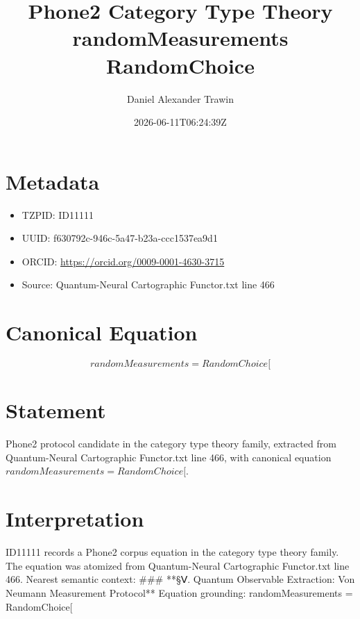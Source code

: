 \documentclass[11pt]{article}
\title{Phone2 Category Type Theory randomMeasurements RandomChoice}
\author{Daniel Alexander Trawin}
\date{2026-06-11T06:24:39Z}
\begin{document}
\maketitle
\section*{Metadata}
\begin{itemize}
\item TZPID: ID11111
\item UUID: f630792c-946c-5a47-b23a-ccc1537ea9d1
\item ORCID: \url{https://orcid.org/0009-0001-4630-3715}
\item Source: Quantum-Neural Cartographic Functor.txt line 466
\end{itemize}
\section*{Canonical Equation}
\[
randomMeasurements = RandomChoice[
\]
\section*{Statement}
Phone2 protocol candidate in the category type theory family, extracted from Quantum-Neural Cartographic Functor.txt line 466, with canonical equation $randomMeasurements = RandomChoice[$.
\section*{Interpretation}
ID11111 records a Phone2 corpus equation in the category type theory family. The equation was atomized from Quantum-Neural Cartographic Functor.txt line 466. Nearest semantic context: ### **§Ⅴ. Quantum Observable Extraction: Von Neumann Measurement Protocol** Equation grounding: randomMeasurements = RandomChoice[
\end{document}

